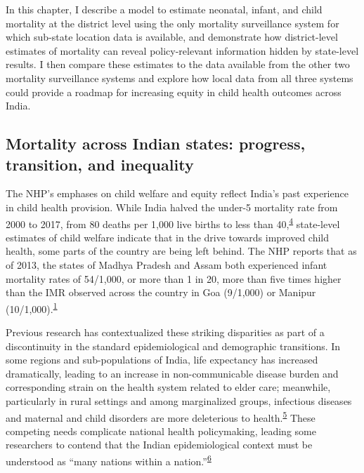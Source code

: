 \documentclass[
]{article}
\begin{document}
In this chapter, I describe a model to estimate neonatal, infant, and child mortality at the district level using the only mortality surveillance system for which sub-state location data is available, and demonstrate how district-level estimates of mortality can reveal policy-relevant information hidden by state-level results. I then compare these estimates to the data available from the other two mortality surveillance systems and explore how local data from all three systems could provide a roadmap for increasing equity in child health outcomes across India.

\hypertarget{mortality-across-indian-states-progress-transition-and-inequality}{%
\subsection{Mortality across Indian states: progress, transition, and inequality}\label{mortality-across-indian-states-progress-transition-and-inequality}}

The NHP's emphases on child welfare and equity reflect India's past experience in child health provision. While India halved the under-5 mortality rate from 2000 to 2017, from 80 deaths per 1,000 live births to less than 40,\textsuperscript{\protect\hyperlink{ref-Dicker2018}{4}} state-level estimates of child welfare indicate that in the drive towards improved child health, some parts of the country are being left behind. The NHP reports that as of 2013, the states of Madhya Pradesh and Assam both experienced infant mortality rates of 54/1,000, or more than 1 in 20, more than five times higher than the IMR observed across the country in Goa (9/1,000) or Manipur (10/1,000).\textsuperscript{\protect\hyperlink{ref-IND_MOHFW2017}{1}}

Previous research has contextualized these striking disparities as part of a discontinuity in the standard epidemiological and demographic transitions. In some regions and sub-populations of India, life expectancy has increased dramatically, leading to an increase in non-communicable disease burden and corresponding strain on the health system related to elder care; meanwhile, particularly in rural settings and among marginalized groups, infectious diseases and maternal and child disorders are more deleterious to health.\textsuperscript{\protect\hyperlink{ref-Yadav2014}{5}} These competing needs complicate national health policymaking, leading some researchers to contend that the Indian epidemiological context must be understood as ``many nations within a nation.''\textsuperscript{\protect\hyperlink{ref-Dandona2016}{6}}
\end{document}
